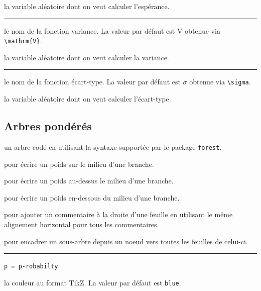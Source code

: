 \documentclass[12pt,a4paper]{book}
\theoremstyle{definition}
\newcommand\separation{
	\medskip
	\hfill\rule{0.5\textwidth}{0.75pt}\hfill
	\medskip
}
\newcommand\extraspace{
	\vspace{0.25em}
}
\newcommand\mwhyprefix[2]{%
	\texttt{#1 = #1-#2}%
}
\begin{document}
{{\IDarg{} la variable aléatoire dont on veut calculer l'espérance.


\separation



\IDoption{} le nom de la fonction variance. La valeur par défaut est $\mathrm{V}$ obtenue via \verb#\mathrm{V}#.

\IDarg{} la variable aléatoire dont on veut calculer la variance.


\separation



\IDoption{} le nom de la fonction écart-type. La valeur par défaut est $\sigma$ obtenue via \verb#\sigma#.

\IDarg{} la variable aléatoire dont on veut calculer l'écart-type.











\subsection{Arbres pondérés}





\Content{} un arbre codé en utilisant la syntaxe supportée par le package \verb+forest+.

\extraspace

  pour écrire un poids sur le milieu d'une branche.

 pour écrire un poids au-dessus le milieu d'une branche.

 pour écrire un poids en-dessous du milieu d'une branche.

\extraspace

 pour ajouter un commentaire à la droite d'une feuille en utilisant le même alignement horizontal pour tous les commentaires.

\extraspace

 pour encadrer un sous-arbre depuis un noeud vers toutes les feuilles de celui-ci.


\separation


 \hfill \mwhyprefix{p}{robabilty}

\IDoption{} la couleur au format TikZ. La valeur par défaut est \verb#blue#.

}}
\end{document}
